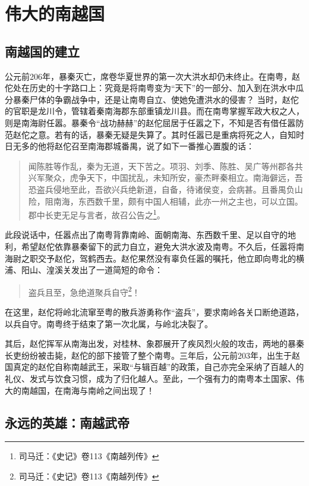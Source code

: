 \chapter{伟大的南越国}

\section{南越国的建立}

公元前206年，暴秦灭亡，席卷华夏世界的第一次大洪水却仍未终止。在南粤，赵佗处在历史的十字路口上：究竟是将南粤变为“天下”的一部分、加入到在洪水中瓜分暴秦尸体的争霸战争中，还是让南粤自立、使她免遭洪水的侵害？
当时，赵佗的官职是龙川令，管辖着秦南海郡东部重镇龙川县。而在南粤掌握军政大权之人，则是南海尉任嚣。暴秦令“战功赫赫”的赵佗屈居于任嚣之下，不知是否有借任嚣防范赵佗之意。若有的话，暴秦无疑是失算了。其时任嚣已是重病将死之人，自知时日无多的他将赵佗召至南海郡城番禺，说了如下一番推心置腹的话：

\begin{quote}
	闻陈胜等作乱，秦为无道，天下苦之。项羽、刘季、陈胜、吴广等州郡各共兴军聚众，虎争天下，中国扰乱，未知所安，豪杰畔秦相立。南海僻远，吾恐盗兵侵地至此，吾欲兴兵绝新道，自备，待诸侯变，会病甚。且番禺负山险，阻南海，东西数千里，颇有中国人相辅，此亦一州之主也，可以立国。郡中长吏无足与言者，故召公告之\footnote{ 司马迁：《史记》卷113《南越列传》}。
\end{quote}

此段说话中，任嚣点出了南粤背靠南岭、面朝南海、东西数千里、足以自守的地利，希望赵佗依靠暴秦留下的武力自立，避免大洪水波及南粤。不久后，任嚣将南海尉之职交予赵佗，驾鹤西去。赵佗果然没有辜负任嚣的嘱托，他立即向粤北的横浦、阳山、湟溪关发出了一道简短的命令：

\begin{quote}
	盗兵且至，急绝道聚兵自守\footnote{司马迁：《史记》卷113《南越列传》}！
\end{quote}

在这里，赵佗将岭北流窜至粤的散兵游勇称作“盗兵”，要求南岭各关口断绝道路，以兵自守。南粤终于结束了第一次北属，与岭北决裂了。

其后，赵佗挥军从南海出发，对桂林、象郡展开了疾风烈火般的攻击，两地的暴秦长吏纷纷被击毙，赵佗的部下接管了整个南粤。三年后，公元前203年，出生于赵国真定的赵佗自称南越武王，采取“与辑百越”的政策，自己亦完全采纳了百越人的礼仪、发式与饮食习惯，成为了归化越人。至此，一个强有力的南粤本土国家、伟大的南越国，在南海与南岭之间出现了！

\section{永远的英雄：南越武帝}

